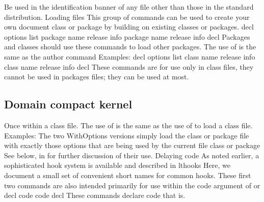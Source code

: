 \documentclass{article}
\begin{document}
Be used in the identification banner of any file other than those in the standard distribution. Loading files This group of commands can be used to create your own document class or package by building on existing classes or packages. decl options list package name release info package name release info decl Packages and classes should use these commands to load other packages. The use of is the same as the author command Examples: decl options list class name release info class name release info decl These commands are for use only in class files, they cannot be used in packages files; they can be used at most.

\subsection{Domain compact kernel}
Once within a class file. The use of is the same as the use of to load a class file. Examples: The two WithOptions versions simply load the class or package file with exactly those options that are being used by the current file class or package See below, in for further discussion of their use. Delaying code As noted earlier, a sophisticated hook system is available and described in lthooks Here, we document a small set of convenient short names for common hooks. These first two commands are also intended primarily for use within the code argument of or decl code code decl These commands declare code that is.
\end{document}
